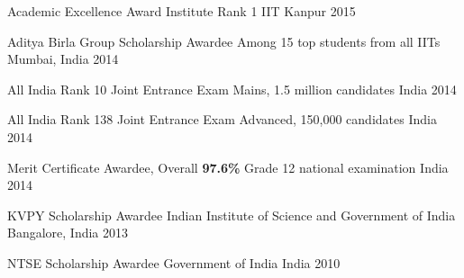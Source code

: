 



\begin{cvhonors}


  \cvhonor
  {Academic Excellence Award} %
  {Institute Rank 1} %
  {IIT Kanpur} %
  {2015} %

  \cvhonor
  {Aditya Birla Group Scholarship Awardee}
  {Among 15 top students from all IITs}
  {Mumbai, India}
  {2014}

  \cvhonor
  {All India Rank 10} %
  {Joint Entrance Exam Mains, 1.5 million candidates} %
  {India} %
  {2014} %


  \cvhonor
  {All India Rank 138} %
  {Joint Entrance Exam Advanced, 150,000 candidates} %
  {India} %
  {2014} %

  \cvhonor
  {Merit Certificate Awardee, Overall \textbf{97.6\%}}
  {Grade 12 national examination}
  {India}
  {2014}

  \cvhonor
  {KVPY Scholarship Awardee}
  {Indian Institute of Science and Government of India}
  {Bangalore, India}
  {2013}

  \cvhonor
  {NTSE Scholarship Awardee}
  {Government of India}
  {India}
  {2010}


\end{cvhonors}

